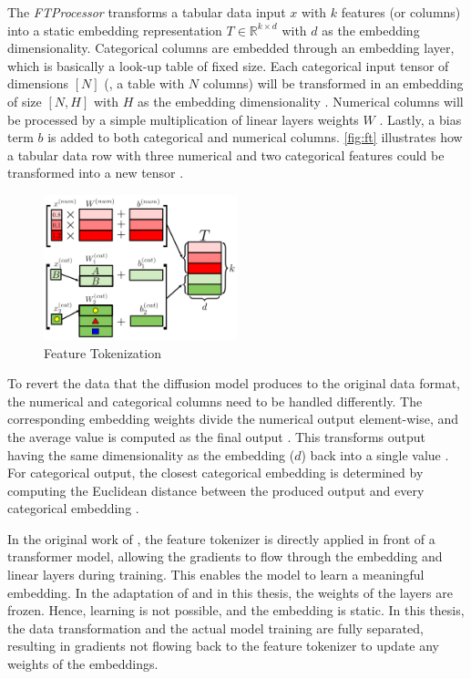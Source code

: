 The \textit{FTProcessor} transforms a tabular data input $x$ with $k$ features (or columns) into a static embedding representation $T \in \mathbb{R}^{k\times d}$ with $d$ as the embedding dimensionality.
Categorical columns are embedded through an embedding layer, which is basically a look-up table \cite{pytorch2023EmbeddingPyTorch13} of fixed size.
Each categorical input tensor of dimensions $[N]$ (\ie, a table with $N$ columns) will be transformed in an embedding of size $[N,H]$ with $H$ as the embedding dimensionality \cite{gorishniy2021RevisitingDeepLearning}.
Numerical columns will be processed by a simple multiplication of linear layers weights $W$ \cite{gorishniy2021RevisitingDeepLearning}.
Lastly, a bias term $b$ is added to both categorical and numerical columns.
\autoref{fig:ft} illustrates how a tabular data row with three numerical and two categorical features could be transformed into a new tensor \cite[Figure 2a, p.4]{gorishniy2021RevisitingDeepLearning}.

\begin{figure}[h]
	\centering
	\includegraphics[width=0.5\textwidth]{images/ft.png}
	\caption[Feature Tokenization]{Feature Tokenization \cite[Figure 2a, p.4]{gorishniy2021RevisitingDeepLearning}}
	\label{fig:ft}
\end{figure}

To revert the data that the diffusion model produces to the original data format, the numerical and categorical columns need to be handled differently.
The corresponding embedding weights divide the numerical output element-wise, and the average value is computed as the final output \cite{zheng2022DiffusionModelsMissing}.
This transforms output having the same dimensionality as the embedding ($d$) back into a single value \cite{zheng2022DiffusionModelsMissing}.
For categorical output, the closest categorical embedding is determined by computing the Euclidean distance between the produced output and every categorical embedding \cite{zheng2022DiffusionModelsMissing}.

In the original work of \cite{gorishniy2021RevisitingDeepLearning}, the feature tokenizer is directly applied in front of a transformer model, allowing the gradients to flow through the embedding and linear layers during training.
This enables the model to learn a meaningful embedding.
In the adaptation of \cite{zheng2023DiffusionModelsMissing} and in this thesis, the weights of the layers are frozen.
Hence, learning is not possible, and the embedding is static.
In this thesis, the data transformation and the actual model training are fully separated,
resulting in gradients not flowing back to the feature tokenizer to update any weights of the embeddings.

